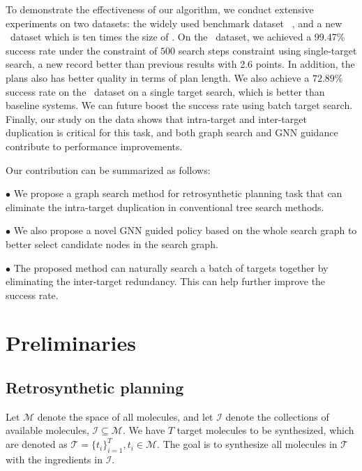 \documentclass[sigconf]{acmart}
\begin{document}
To demonstrate the effectiveness of our algorithm, we conduct extensive experiments on two datasets: the widely used benchmark dataset \uspto ~\cite{Chen2020}, and a new \usptoext~dataset which is ten times the size of \uspto.
On the \uspto~dataset, we achieved a 99.47\% success rate under the constraint of $500$ search steps constraint using single-target search, a new record better than previous results with 2.6 points.
In addition, the plans also has better quality in terms of plan length.
We also achieve a $72.89\%$ success rate on the \usptoext~dataset on a single target search, which is better than baseline systems.
We can future boost the success rate using batch target search.
Finally, our study on the data shows that intra-target and inter-target duplication is critical for this task, and both graph search and GNN guidance contribute to performance improvements.



Our contribution can be summarized as follows:

$\bullet$ We propose a graph search method for retrosynthetic planning task that can eliminate the intra-target duplication in conventional tree search methods.

$\bullet$ We also propose a novel GNN guided policy based on the whole search graph to better select candidate nodes in the search graph.

$\bullet$ The proposed method can naturally search a batch of targets together by eliminating the inter-target redundancy. This can help further improve the success rate.





\section{Preliminaries}

\subsection{Retrosynthetic planning}

Let $\mathcal{M}$ denote the space of all molecules, and let $\mathcal{I}$ denote the collections of available molecules, $\mathcal{I}\subseteq\mathcal{M}$. We have $T$ target molecules to be synthesized, which are denoted as $\mathcal{T} = \{t_i\}_{i=1}^T, t_i \in \mathcal{M}$. The goal is to synthesize all molecules in $\mathcal{T}$ with  the ingredients in $\mathcal{I}$. 
\end{document}
